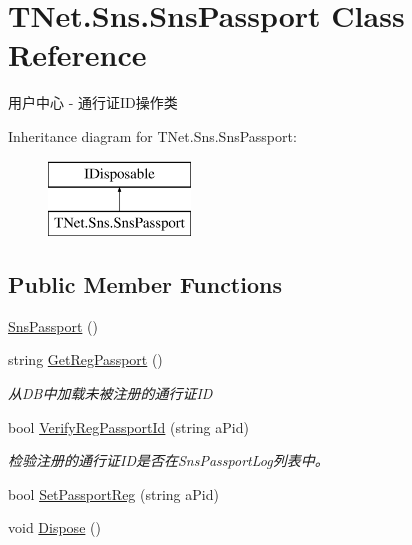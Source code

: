 \hypertarget{class_t_net_1_1_sns_1_1_sns_passport}{}\section{T\+Net.\+Sns.\+Sns\+Passport Class Reference}
\label{class_t_net_1_1_sns_1_1_sns_passport}


用户中心 -\/ 通行证\+I\+D操作类  


Inheritance diagram for T\+Net.\+Sns.\+Sns\+Passport\+:\begin{figure}[H]
\begin{center}
\leavevmode
\includegraphics[height=2.000000cm]{class_t_net_1_1_sns_1_1_sns_passport}
\end{center}
\end{figure}
\subsection*{Public Member Functions}
\begin{DoxyCompactItemize}
\item 
\mbox{\hyperlink{class_t_net_1_1_sns_1_1_sns_passport_a35c61ef439784f1215563eac9c95b211}{Sns\+Passport}} ()
\item 
string \mbox{\hyperlink{class_t_net_1_1_sns_1_1_sns_passport_a9cec1c409406dcfb3ca89d7cc2c12d57}{Get\+Reg\+Passport}} ()
\begin{DoxyCompactList}\small\item\em 从\+D\+B中加载未被注册的通行证\+ID \end{DoxyCompactList}\item 
bool \mbox{\hyperlink{class_t_net_1_1_sns_1_1_sns_passport_afca27166aabe5115e4af4da251b86db5}{Verify\+Reg\+Passport\+Id}} (string a\+Pid)
\begin{DoxyCompactList}\small\item\em 检验注册的通行证\+I\+D是否在\+Sns\+Passport\+Log列表中。 \end{DoxyCompactList}\item 
bool \mbox{\hyperlink{class_t_net_1_1_sns_1_1_sns_passport_a1c5c9da79ff37f89c85a461fb8167bb4}{Set\+Passport\+Reg}} (string a\+Pid)
\item 
void \mbox{\hyperlink{class_t_net_1_1_sns_1_1_sns_passport_a9c7e6edd5a2e2e851814231540f7be6b}{Dispose}} ()
\end{DoxyCompactItemize}


